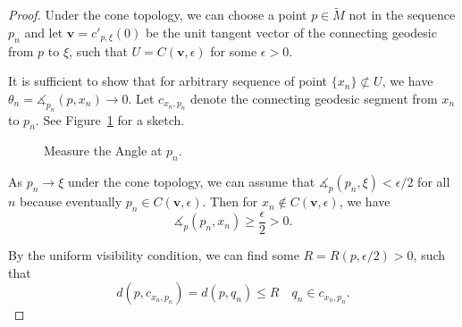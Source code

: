 \documentclass[reqno,11pt]{article}
\theoremstyle{definition}
\theoremstyle{remark}
\numberwithin{equation}{section}
\begin{document}
\begin{proof}
	Under the cone topology, we can choose a point $p\in\widetilde{M}$ not in the sequence $p_n$ and let $\bm{v}=c'_{p,\xi}(0)$ be the unit tangent vector of the connecting geodesic from $p$ to $\xi$, such that $U=C(\bm{v},\epsilon)$ for some $\epsilon>0$.

	It is sufficient to show that for arbitrary sequence of point $\{x_n\}\not\subset U$, we have $\theta_n=\measuredangle_{p_n}(p,x_n)\to 0$. Let $c_{x_n,p_n}$ denote the connecting geodesic segment from $x_n$ to $p_n$. See Figure~\ref{fig9} for a sketch.

	\begin{figure}[htbp]
		\centering
		\caption{Measure the Angle at $p_n$.}\label{fig9}
	\end{figure}

	As $p_n\to\xi$ under the cone topology, we can assume that $\measuredangle_p(p_n,\xi)<\epsilon/2$ for all $n$ because eventually $p_n\in C(\bm{v},\epsilon)$. Then for $x_n\notin C(\bm{v},\epsilon)$, we have
	\begin{displaymath}
		\measuredangle_{p}(p_n,x_n)\geq\frac \epsilon2>0.
	\end{displaymath}

	By the uniform visibility condition, we can find some $R=R(p,\epsilon/2)>0$, such that
	\begin{displaymath}
		d(p,c_{x_n,p_n})=d(p,q_n)\leq R\quad q_n\in c_{x_n,p_n}.
	\end{displaymath}


\end{proof}
\end{document}
